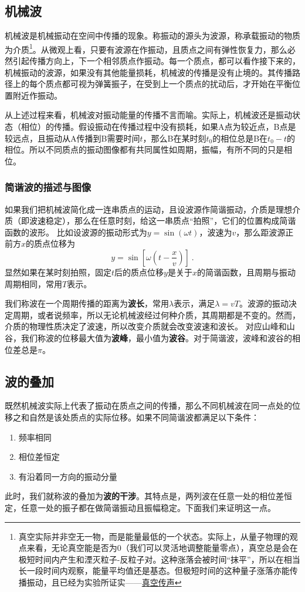 
\subsection{机械波}
机械波是机械振动在空间中传播的现象。称振动的源头为波源，称承载振动的物质为介质\footnote{真空实际并非空无一物，而是能量最低的一个状态。实际上，从量子物理的观点来看，无论真空能是否为0（我们可以灵活地调整能量零点），真空总是会在极短时间内产生和湮灭粒子-反粒子对。这种涨落会被时间“抹平”，所以在相当长一段时间内观察，能量平均值还是基态。但极短时间的这种量子涨落亦能传播振动，且已经为实验所证实——\href{https://www.rmzxw.com.cn/c/2023-08-25/3399291.shtml}{真空传声}}。从微观上看，只要有波源在作振动，且质点之间有弹性恢复力，那么必然引起传播方向上，下一个相邻质点作振动。每一个质点，都可以看作接下来的，机械振动的波源，如果没有其他能量损耗，机械波的传播是没有止境的。其传播路径上的每个质点都可视为弹簧振子，在受到上一个质点的扰动后，才开始在平衡位置附近作振动。

从上述过程来看，机械波对振动能量的传播不言而喻。实际上，机械波还是振动状态（相位）的传播。假设振动在传播过程中没有损耗，如果A点为较近点，B点是较远点，且振动从A传播到B需要时间$t$，那么B在某时刻$t_0$的相位总是B在$t_0-t$的相位。所以不同质点的振动图像都有共同属性如周期，振幅，有所不同的只是相位。
\subsubsection{简谐波的描述与图像}
如果我们把机械波简化成一连串质点的运动，且设波源作简谐振动，介质是理想介质（即波速稳定），那么在任意时刻，给这一串质点“拍照”，它们的位置构成简谐函数的波形。
比如设波源的振动形式为$y=\sin(\omega t)$，波速为$v$，那么距波源正前方$x$的质点位移为
\begin{equation}
y=\sin [\omega (t-\frac{x}{v})]~.
\end{equation}
显然如果在某时刻拍照，固定$t$后的质点位移$y$是关于$x$的简谐函数，且周期与振动周期相同，常用$T$表示。%

我们称波在一个周期传播的距离为\textbf{波长}，常用$\lambda $表示，满足$\lambda=vT$。波源的振动决定周期，或者说频率，所以无论机械波经过何种介质，其周期都是不变的。然而，介质的物理性质决定了波速，所以改变介质就会改变波速和波长。
对应山峰和山谷，我们称波的位移最大值为\textbf{波峰}，最小值为\textbf{波谷}。对于简谐波，波峰和波谷的相位差总是$\pi$。

\subsection{波的叠加}
既然机械波实际上代表了振动在质点之间的传播，那么不同机械波在同一点处的位移之和自然是该处质点的实际位移。如果不同简谐波都满足以下条件：
\begin{enumerate}
\item 频率相同
\item 相位差恒定
\item 有沿着同一方向的振动分量
\end{enumerate}
此时，我们就称波的叠加为\textbf{波的干涉}。其特点是，两列波在任意一处的相位差恒定，任意一处的振子都在做简谐振动且振幅稳定。下面我们来证明这一点。

